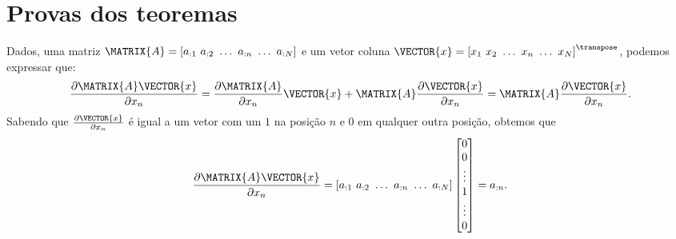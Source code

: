 \section{Provas dos teoremas}

\begin{myproofT}\label{proof:theo:derAx}
Dados,
uma matriz $\MATRIX{A}=\left[a_{:1}~ a_{:2}~ \hdots~ a_{:n}~ \hdots~ a_{:N}\right]$ e 
um vetor coluna $\VECTOR{x}=\left[x_{1}~ x_{2}~ \hdots~ x_{n}~ \hdots~ x_{N}\right]^{\transpose}$, 
podemos expressar que:
\begin{equation}
\frac{\partial \MATRIX{A}\VECTOR{x}}{\partial x_n}=
\frac{\partial \MATRIX{A}}{\partial x_n}\VECTOR{x}+\MATRIX{A}\frac{\partial \VECTOR{x}}{\partial x_n}=
\MATRIX{A}\frac{\partial \VECTOR{x}}{\partial x_n}.
\end{equation}
Sabendo que $\frac{\partial \VECTOR{x}}{\partial x_n}$ é igual a um vetor 
com um $1$ na posição $n$ e $0$ em qualquer outra posição, obtemos que
\begin{equation}
\frac{\partial \MATRIX{A}\VECTOR{x}}{\partial x_n}=
\left[a_{:1}~ a_{:2}~ \hdots~ a_{:n}~ \hdots~ a_{:N}\right]\left[
\begin{matrix}
 0\\
 0\\
 \vdots\\
 1\\
 \vdots\\
 0
\end{matrix}
\right]=a_{:n}.
\end{equation}
\end{myproofT}

